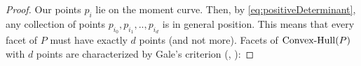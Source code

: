 \begin{proof}
  Our points $p_i$ lie on the moment curve.
  Then, by \eqref{eq:positiveDeterminant}, any collection of points $p_{i_0}, p_{i_1}, .., p_{i_d}$ is in general position.
  This means that every facet of $P$ must have exactly $d$ points (and not more).
  Facets of $\operatorname{Convex-Hull}(P)$ with $d$ points are characterized by Gale's criterion
  (\cite[Theorem 3]{Gale}, \cite[Theorem 0.7]{Ziegler}):











\end{proof}
